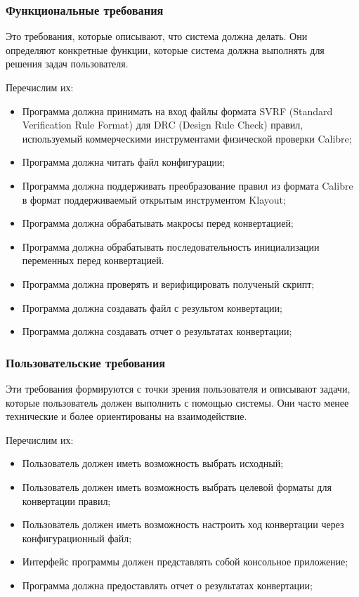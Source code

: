 \subsubsection{Функциональные требования}

Это требования, которые описывают, что система должна делать.
Они определяют конкретные функции,
которые система должна выполнять для решения задач пользователя.

Перечислим их:

\begin{itemize}
    \item Программа должна принимать на вход файлы
		формата SVRF (Standard Verification Rule Format)
		для DRC (Design Rule Check) правил,
		используемый коммерческими инструментами физической проверки
		Calibre;
	\item Программа должна читать файл конфигурации;
    \item Программа должна поддерживать преобразование правил из формата
		Calibre в формат поддерживаемый открытым инструментом Klayout;
    \item Программа должна обрабатывать макросы перед конвертацией;
    \item Программа должна обрабатывать последовательность 
		инициализации переменных перед конвертацией.
	\item Программа должна проверять и верифицировать полученый скрипт;
	\item Программа должна создавать файл с результом конвертации;
	\item Программа должна создавать отчет о результатах конвертации;
\end{itemize}

\subsubsection{Пользовательские требования}

Эти требования формируются с точки зрения пользователя и описывают задачи,
которые пользователь должен выполнить с помощью системы.
Они часто менее технические и более ориентированы на взаимодействие.

Перечислим их:

\begin{itemize}
    \item Пользователь должен иметь возможность выбрать исходный;
    \item Пользователь должен иметь возможность выбрать
		целевой форматы для конвертации правил;
    \item Пользователь должен иметь возможность настроить ход конвертации
		через конфигурационный файл;
    \item Интерфейс программы должен представлять собой консольное приложение;
    \item Программа должна предоставлять отчет о результатах конвертации;
\end{itemize}

